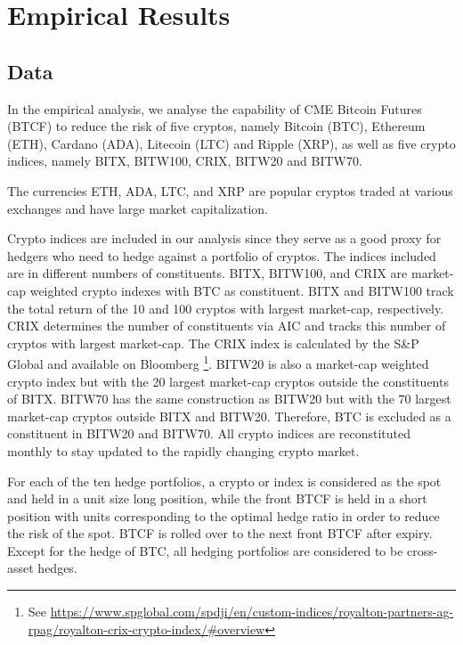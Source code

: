 \section{Empirical Results}\label{sec:results}

\subsection{Data}\label{subsec:data}
In the empirical analysis, we analyse the capability 
of CME Bitcoin Futures (BTCF) to reduce the risk of
five cryptos, namely Bitcoin (BTC), Ethereum 
(ETH), Cardano (ADA), Litecoin (LTC) and Ripple (XRP), as well as five
crypto indices, namely BITX, BITW100, CRIX, BITW20 and BITW70.

The currencies ETH, ADA, LTC, and XRP are popular cryptos traded at
various exchanges and have large market capitalization. 


Crypto indices are included in our analysis since they serve as a good proxy
for hedgers who need to hedge against a portfolio of cryptos.
The indices included are in different numbers of constituents. 
BITX, BITW100, and CRIX are market-cap weighted crypto indexes with
BTC as constituent. 
BITX and BITW100 track the total return of the 10 and 100 cryptos
with largest market-cap, respectively. 
CRIX determines the number of constituents via AIC and tracks this
number of cryptos with largest market-cap. 
The CRIX index is calculated by the S\&P Global and available on Bloomberg
\footnote{See \url{https://www.spglobal.com/spdji/en/custom-indices/royalton-partners-ag-rpag/royalton-crix-crypto-index/\#overview}}.
BITW20 is also a market-cap weighted crypto index but with the 20
largest market-cap cryptos outside the constituents of BITX.
BITW70 has the same construction as BITW20 but with the 70 largest
market-cap cryptos outside BITX and BITW20. 
Therefore, BTC is excluded as a constituent in BITW20 and BITW70.
All crypto indices are reconstituted monthly to stay updated to the rapidly changing crypto market. 

For each of the ten hedge portfolios, a crypto or index is considered
as the spot and held in a unit size long position, while 
the front BTCF is held in a short position with units corresponding to
the optimal hedge ratio in order to reduce the risk of the spot. 
BTCF is rolled over to the next front BTCF after expiry. 
Except for the hedge of BTC, all hedging portfolios are considered to
be cross-asset hedges. 


